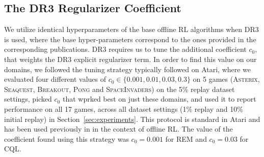 \subsection{The DR3 Regularizer Coefficient}
\label{app:tuning_dr3}
\vspace{-0.2cm}
We utilize identical hyperparameters of the base offline RL algorithms when DR3 is used, where the base hyper-parameters correspond to the ones provided in the corresponding publications. DR3 requires us to tune the additional coefficient $c_0$, that weights the DR3 explicit regularizer term. In order to find this value on our domains, we followed the tuning strategy typically followed on Atari, where we evaluated four different values of $c_0 \in \{0.001, 0.01, 0.03, 0.3\}$ on 5 games (\textsc{Asterix}, \textsc{Seaquest}, \textsc{Breakout}, \textsc{Pong} and \textsc{SpaceInvaders}) on the 5\% replay dataset settings, picked $c_0$ that wprked best on just these domains, and used it to report performance on all 17 games, across all dataset settings (1\% replay and 10\% initial replay) in Section~\ref{sec:experiments}. This protocol is standard in Atari and has been used previously in \citet{agarwal2019optimistic,gulcehre2020rl,kumar2021implicit} in the context of offline RL. The value of the coefficient found using this strategy was $c_0 = 0.001$ for REM and $c_0 = 0.03$ for CQL.







